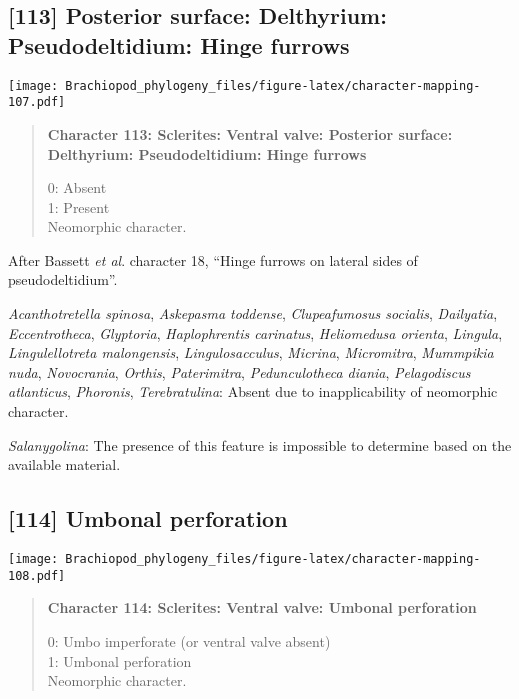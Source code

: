 \documentclass[openany]{book}
\theoremstyle{definition}
\theoremstyle{definition}
\theoremstyle{definition}
\theoremstyle{remark}
\begin{document}
\subsection*{{[}113{]} Posterior surface: Delthyrium: Pseudodeltidium:
Hinge
furrows}\label{posterior-surface-delthyrium-pseudodeltidium-hinge-furrows}

\texttt{[image: Brachiopod\_phylogeny\_files/figure-latex/character-mapping-107.pdf]}

\begin{quote}
\textbf{Character 113: Sclerites: Ventral valve: Posterior surface:
Delthyrium: Pseudodeltidium: Hinge furrows}

0: Absent\\
1: Present\\
Neomorphic character.
\end{quote}

After Bassett \emph{et al}.
\citeyearpar{Bassett2001Functionalmorphology} character 18, ``Hinge
furrows on lateral sides of pseudodeltidium''.

\hypertarget{Acanthotretella_spinosa-coding-113}{}
\emph{Acanthotretella spinosa}, \emph{Askepasma toddense},
\emph{Clupeafumosus socialis}, \emph{Dailyatia}, \emph{Eccentrotheca},
\emph{Glyptoria}, \emph{Haplophrentis carinatus}, \emph{Heliomedusa
orienta}, \emph{Lingula}, \emph{Lingulellotreta malongensis},
\emph{Lingulosacculus}, \emph{Micrina}, \emph{Micromitra},
\emph{Mummpikia nuda}, \emph{Novocrania}, \emph{Orthis},
\emph{Paterimitra}, \emph{Pedunculotheca diania}, \emph{Pelagodiscus
atlanticus}, \emph{Phoronis}, \emph{Terebratulina}: Absent due to
inapplicability of neomorphic character.

\hypertarget{Salanygolina-coding-113}{}
\emph{Salanygolina}: The presence of this feature is impossible to
determine based on the available material.

\subsection*{{[}114{]} Umbonal perforation}\label{umbonal-perforation}

\texttt{[image: Brachiopod\_phylogeny\_files/figure-latex/character-mapping-108.pdf]}

\begin{quote}
\textbf{Character 114: Sclerites: Ventral valve: Umbonal perforation}

0: Umbo imperforate (or ventral valve absent)\\
1: Umbonal perforation\\
Neomorphic character.
\end{quote}
\end{document}
